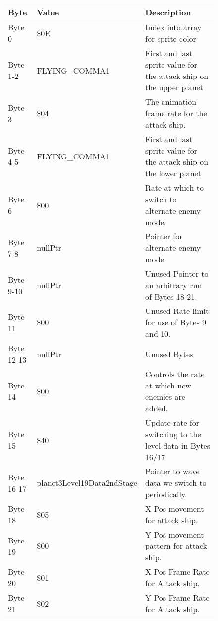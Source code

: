 \begin{figure}[H]
{\begin{adjustbox}{width=12cm}
\begin{tabular}{lll}
\toprule
 Byte       & Value                      & Description                                                         \\
\midrule
 Byte 0     & \$0E                        & Index into array for sprite color                                   \\
 Byte 1-2   & FLYING\_COMMA1              & First and last sprite value for the attack ship on the upper planet \\
 Byte 3     & \$04                        & The animation frame rate for the attack ship.                       \\
 Byte 4-5   & FLYING\_COMMA1              & First and last sprite value for the attack ship on the lower planet \\
 Byte 6     & \$00                        & Rate at which to switch to alternate enemy mode.                    \\
 Byte 7-8   & nullPtr                    & Pointer for alternate enemy mode                                    \\
 Byte 9-10  & nullPtr                    & Unused Pointer to an arbitrary run of Bytes 18-21.                  \\
 Byte 11    & \$00                        & Unused Rate limit for use of Bytes 9 and 10.                        \\
 Byte 12-13 & nullPtr                    & Unused Bytes                                                        \\
 Byte 14    & \$00                        & Controls the rate at which new enemies are added.                   \\
 Byte 15    & \$40                        & Update rate for switching to the level data in Bytes 16/17          \\
 Byte 16-17 & planet3Level19Data2ndStage & Pointer to wave data we switch to periodically.                     \\
 Byte 18    & \$05                        & X Pos movement for attack ship.                                     \\
 Byte 19    & \$00                        & Y Pos movement pattern for attack ship.                             \\
 Byte 20    & \$01                        & X Pos Frame Rate for Attack ship.                                   \\
 Byte 21    & \$02                        & Y Pos Frame Rate for Attack ship.                                   \\

\end{tabular}
\end{adjustbox}}
\end{figure}
